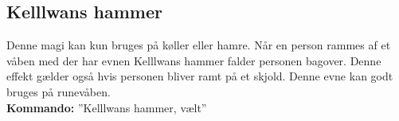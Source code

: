 \subsection{Kelllwans hammer}
Denne magi kan kun bruges på køller eller hamre. Når en person rammes af et våben med der har evnen Kelllwans hammer falder personen bagover. Denne effekt gælder også hvis personen bliver ramt på et skjold. Denne evne kan godt bruges på runevåben.\\ 
\textbf{Kommando:} ”Kelllwans hammer, vælt”

